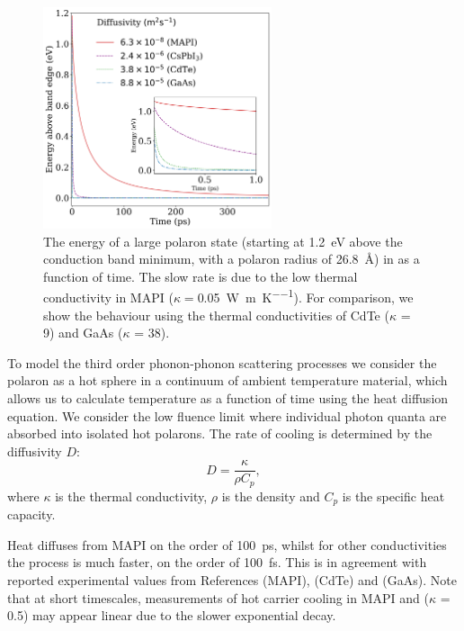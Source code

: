 \begin{table}
\begin{figure}[h]
\centering
  \includegraphics[width=0.6\textwidth]{figures/ch5/f4.png}
  \caption[Hot carrier cooling rate]{The energy of a large polaron state (starting at \SI{1.2}{\electronvolt} above the conduction band minimum, with a polaron radius of \SI{26.8}{\angstrom}) 
  in  as a function of time.
  The slow rate is due to the low thermal conductivity in MAPI ($\kappa=$\SI{0.05}{\watt\per\metre\per\K}). 
  For comparison, we show the behaviour using the thermal conductivities of 
  CdTe ($\kappa$ = 9) and GaAs ($\kappa$ = 38). }
  \label{ch5TemperatureTime}
\end{figure}

To model the third order phonon-phonon scattering processes we consider the polaron as a hot sphere in a continuum of ambient temperature material, which allows us to calculate temperature as a function of time using the heat diffusion equation.
We consider the low fluence limit where individual photon quanta are absorbed into isolated hot polarons.
The rate of cooling is determined by the diffusivity $D$: 
\begin{equation}
    D= \frac{\kappa}{\rho C_p},
\end{equation} 
where $\kappa$ is the thermal conductivity, $\rho$ is the density and $C_p$ is the specific heat capacity. 

Heat diffuses from MAPI on the order of  \SI{100}{\pico\second}, whilst for other conductivities the process is much faster, on the order of \SI{100}{\femto\second}. 
This is in agreement with reported experimental values from References \cite{Klein2016} (MAPI), \cite{Zhong2017} (CdTe) and \cite{Rosenwaks1993} (GaAs). 
Note that at short timescales, measurements of hot carrier cooling in MAPI and  ($\kappa$ = 0.5) may appear linear due to the slower exponential decay.


\end{table}
